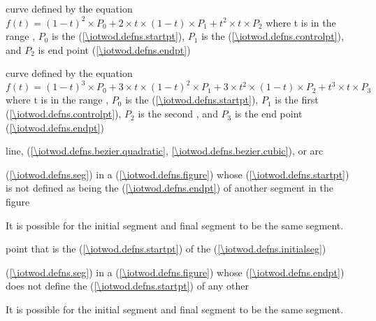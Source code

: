 %
%
 curve defined by the 
equation $f(t) = (1 - t)^{2} \times P_{0} + 2 \times t \times (1 - t) 
\times P_{1} + t^{2} \times t \times P_{2}$ where t is in the range , $P_{0}$ is the  (\ref{\iotwod.defns.startpt}), $P_{1}$ is the  (\ref{\iotwod.defns.controlpt}), and $P_{2}$ is end point (\ref{\iotwod.defns.endpt})

 curve defined by the 
equation $f(t) = (1 - t)^{3} \times P_{0} + 3 \times t \times (1 - t)^{2} 
\times P_{1} + 3 \times t^{2} \times (1 - t) \times P_{2} + t^{3} \times t 
\times P_{3}$ where t is in the range , $P_{0}$ is the  (\ref{\iotwod.defns.startpt}), $P_{1}$ is the first  (\ref{\iotwod.defns.controlpt}), $P_{2}$ is the second , and $P_{3}$ is the end point (\ref{\iotwod.defns.endpt})

%
line,  (\ref{\iotwod.defns.bezier.quadratic}, \ref{\iotwod.defns.bezier.cubic}), or arc

%
 (\ref{\iotwod.defns.seg}) in a  (\ref{\iotwod.defns.figure}) whose  (\ref{\iotwod.defns.startpt}) is not defined as being the  (\ref{\iotwod.defns.endpt}) of another segment in the figure
\begin{note}
It is possible for the initial segment and final segment to be the same segment.
\end{note}

%
point that is the  (\ref{\iotwod.defns.startpt}) of the  (\ref{\iotwod.defns.initialseg})

%
 (\ref{\iotwod.defns.seg}) in a  (\ref{\iotwod.defns.figure}) whose  (\ref{\iotwod.defns.endpt}) does not define the  (\ref{\iotwod.defns.startpt}) of any other 
\begin{note}
It is possible for the initial segment and final segment to be the same segment.
\end{note}

